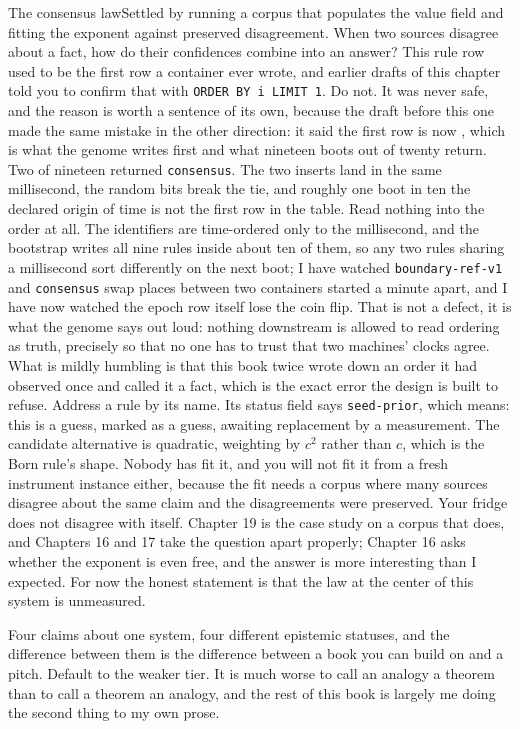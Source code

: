 \begin{Open}{The consensus law}{Settled by running a corpus that populates the value field and fitting the exponent against preserved disagreement.}
When two sources disagree about a fact, how do their confidences combine into an answer? This rule row used to be the first row a container ever wrote, and earlier drafts of this chapter told you to confirm that with \texttt{ORDER BY i LIMIT 1}. Do not. It was never safe, and the reason is worth a sentence of its own, because the draft before this one made the same mistake in the other direction: it said the first row is now , which is what the genome writes first and what nineteen boots out of twenty return. Two of nineteen returned \texttt{consensus}. The two inserts land in the same millisecond, the random bits break the tie, and roughly one boot in ten the declared origin of time is not the first row in the table. Read nothing into the order at all. The identifiers are time-ordered only to the millisecond, and the bootstrap writes all nine rules inside about ten of them, so any two rules sharing a millisecond sort differently on the next boot; I have watched \texttt{boundary-ref-v1} and \texttt{consensus} swap places between two containers started a minute apart, and I have now watched the epoch row itself lose the coin flip. That is not a defect, it is what the genome says out loud: nothing downstream is allowed to read ordering as truth, precisely so that no one has to trust that two machines' clocks agree. What is mildly humbling is that this book twice wrote down an order it had observed once and called it a fact, which is the exact error the design is built to refuse. Address a rule by its name. Its status field says \texttt{seed-prior}, which means: this is a guess, marked as a guess, awaiting replacement by a measurement. The candidate alternative is quadratic, weighting by $c^2$ rather than $c$, which is the Born rule's shape. Nobody has fit it, and you will not fit it from a fresh instrument instance either, because the fit needs a corpus where many sources disagree about the same claim and the disagreements were preserved. Your fridge does not disagree with itself. Chapter 19 is the case study on a corpus that does, and Chapters 16 and 17 take the question apart properly; Chapter 16 asks whether the exponent is even free, and the answer is more interesting than I expected. For now the honest statement is that the law at the center of this system is unmeasured.
\end{Open}

Four claims about one system, four different epistemic statuses, and the difference between them is the difference between a book you can build on and a pitch. Default to the weaker tier. It is much worse to call an analogy a theorem than to call a theorem an analogy, and the rest of this book is largely me doing the second thing to my own prose.

